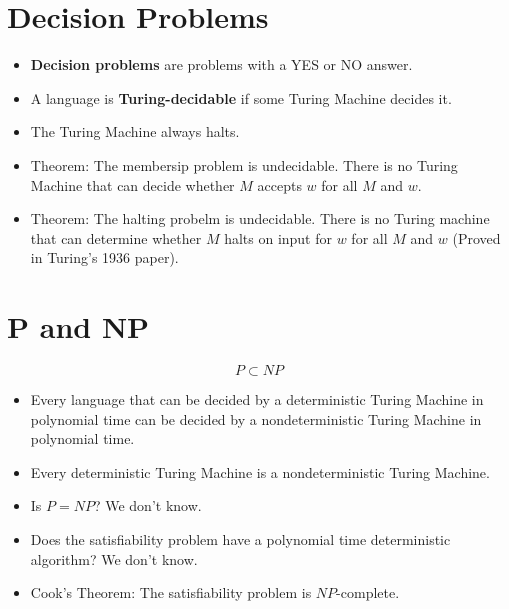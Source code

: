 \documentclass[a4paper]{article}
\begin{document}
\begin{multicols}{2}
	\section{Decision Problems}
	\begin{itemize}
		\item \textbf{Decision problems} are problems with a YES or NO answer.
		\item A language is \textbf{Turing-decidable} if some Turing Machine decides
					it.
		\item The Turing Machine always halts.
		\item Theorem: The membersip problem is undecidable. There is no Turing
					Machine that can decide whether $M$ accepts $w$ for all $M$ and $w$.
		\item Theorem: The halting probelm is undecidable. There is no Turing
					machine that can determine whether $M$ halts on input for $w$ for all
					$M$ and $w$ (Proved in Turing's 1936 paper).
	\end{itemize}

	\section{P and NP}
	$$P \subset NP$$
	\begin{itemize}
		\item Every language that can be decided by a deterministic Turing
					Machine in polynomial time can be decided by a nondeterministic
					Turing Machine in polynomial time.
		\item Every deterministic Turing Machine is a nondeterministic Turing
					Machine.
		\item Is $P = NP$? We don't know.
		\item Does the satisfiability problem have a polynomial time deterministic
					algorithm? We don't know.
		\item Cook's Theorem: The satisfiability problem is $NP$-complete.
	\end{itemize}

\end{multicols}
\end{document}
